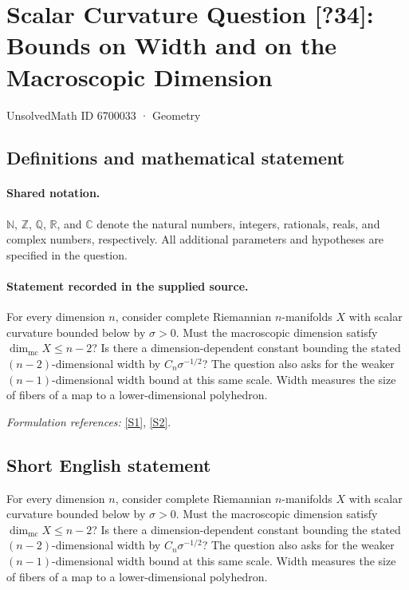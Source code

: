 \documentclass[11pt]{article}
\newcommand{\sref}[2]{\hyperlink{source:#1:#2}{[S#2]}}
\begin{document}
\setcounter{section}{6700032}
\section{Scalar Curvature Question [?34]: Bounds on Width and on the Macroscopic Dimension}\label{6700033}
{\small UnsolvedMath ID 6700033 · Geometry}
\subsection{Definitions and mathematical statement}

\paragraph{Shared notation.}$\mathbb N$, $\mathbb Z$, $\mathbb Q$, $\mathbb R$, and $\mathbb C$ denote the natural numbers, integers, rationals, reals, and complex numbers, respectively. All additional parameters and hypotheses are specified in the question.


\paragraph{Statement recorded in the supplied source.}
For every dimension $n$, consider complete Riemannian $n$-manifolds $X$ with scalar curvature bounded below by $\sigma>0$. Must the macroscopic dimension satisfy $\dim_{\mathrm{mc}}X\leq n-2$? Is there a dimension-dependent constant bounding the stated $(n-2)$-dimensional width by $C_n\sigma^{-1/2}$? The question also asks for the weaker $(n-1)$-dimensional width bound at this same scale. Width measures the size of fibers of a map to a lower-dimensional polyhedron.
\par\smallskip\textit{Formulation references:} \sref{6700033}{1}, \sref{6700033}{2}.
\subsection{Short English statement}
For every dimension $n$, consider complete Riemannian $n$-manifolds $X$ with scalar curvature bounded below by $\sigma>0$. Must the macroscopic dimension satisfy $\dim_{\mathrm{mc}}X\leq n-2$? Is there a dimension-dependent constant bounding the stated $(n-2)$-dimensional width by $C_n\sigma^{-1/2}$? The question also asks for the weaker $(n-1)$-dimensional width bound at this same scale. Width measures the size of fibers of a map to a lower-dimensional polyhedron.
\end{document}
